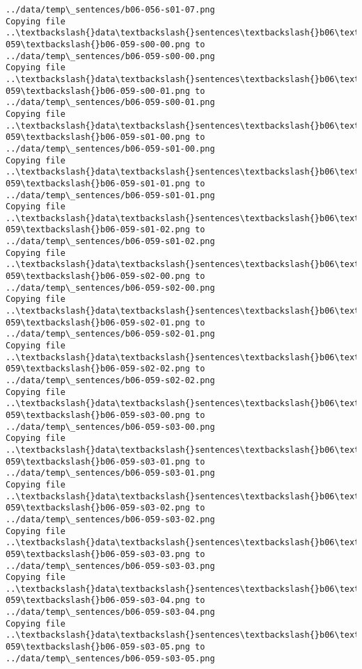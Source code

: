 \documentclass[11pt]{article}
\begin{document}
\begin{Verbatim}[commandchars=\\\{\}]
../data/temp\_sentences/b06-056-s01-07.png
Copying file ..\textbackslash{}data\textbackslash{}sentences\textbackslash{}b06\textbackslash{}b06-059\textbackslash{}b06-059-s00-00.png to
../data/temp\_sentences/b06-059-s00-00.png
Copying file ..\textbackslash{}data\textbackslash{}sentences\textbackslash{}b06\textbackslash{}b06-059\textbackslash{}b06-059-s00-01.png to
../data/temp\_sentences/b06-059-s00-01.png
Copying file ..\textbackslash{}data\textbackslash{}sentences\textbackslash{}b06\textbackslash{}b06-059\textbackslash{}b06-059-s01-00.png to
../data/temp\_sentences/b06-059-s01-00.png
Copying file ..\textbackslash{}data\textbackslash{}sentences\textbackslash{}b06\textbackslash{}b06-059\textbackslash{}b06-059-s01-01.png to
../data/temp\_sentences/b06-059-s01-01.png
Copying file ..\textbackslash{}data\textbackslash{}sentences\textbackslash{}b06\textbackslash{}b06-059\textbackslash{}b06-059-s01-02.png to
../data/temp\_sentences/b06-059-s01-02.png
Copying file ..\textbackslash{}data\textbackslash{}sentences\textbackslash{}b06\textbackslash{}b06-059\textbackslash{}b06-059-s02-00.png to
../data/temp\_sentences/b06-059-s02-00.png
Copying file ..\textbackslash{}data\textbackslash{}sentences\textbackslash{}b06\textbackslash{}b06-059\textbackslash{}b06-059-s02-01.png to
../data/temp\_sentences/b06-059-s02-01.png
Copying file ..\textbackslash{}data\textbackslash{}sentences\textbackslash{}b06\textbackslash{}b06-059\textbackslash{}b06-059-s02-02.png to
../data/temp\_sentences/b06-059-s02-02.png
Copying file ..\textbackslash{}data\textbackslash{}sentences\textbackslash{}b06\textbackslash{}b06-059\textbackslash{}b06-059-s03-00.png to
../data/temp\_sentences/b06-059-s03-00.png
Copying file ..\textbackslash{}data\textbackslash{}sentences\textbackslash{}b06\textbackslash{}b06-059\textbackslash{}b06-059-s03-01.png to
../data/temp\_sentences/b06-059-s03-01.png
Copying file ..\textbackslash{}data\textbackslash{}sentences\textbackslash{}b06\textbackslash{}b06-059\textbackslash{}b06-059-s03-02.png to
../data/temp\_sentences/b06-059-s03-02.png
Copying file ..\textbackslash{}data\textbackslash{}sentences\textbackslash{}b06\textbackslash{}b06-059\textbackslash{}b06-059-s03-03.png to
../data/temp\_sentences/b06-059-s03-03.png
Copying file ..\textbackslash{}data\textbackslash{}sentences\textbackslash{}b06\textbackslash{}b06-059\textbackslash{}b06-059-s03-04.png to
../data/temp\_sentences/b06-059-s03-04.png
Copying file ..\textbackslash{}data\textbackslash{}sentences\textbackslash{}b06\textbackslash{}b06-059\textbackslash{}b06-059-s03-05.png to
../data/temp\_sentences/b06-059-s03-05.png

\end{Verbatim}
\end{document}
